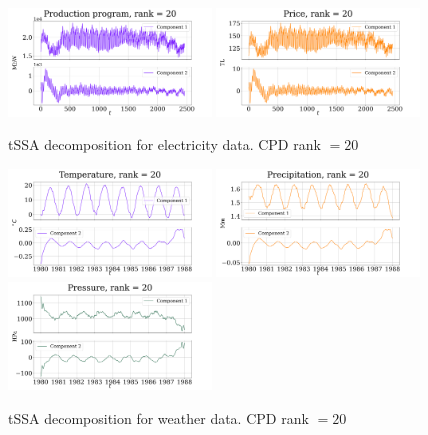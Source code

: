 \documentclass[referee, pdflatex]{sn-jnl}
\theoremstyle{definition}
\theoremstyle{plain}
\begin{document}
	\begin{figure}[h]
		\centering
		\includegraphics[width=0.48\textwidth, keepaspectratio]{../../experiments/electricity/tssa/figs/decomposition/cpd_rank_20/Production program.png}
		\includegraphics[width=0.48\textwidth, keepaspectratio]{../../experiments/electricity/tssa/figs/decomposition/cpd_rank_20/Price.png}
		\caption{tSSA decomposition for electricity data. CPD rank $ = 20 $}\label{fig:electr_decomp_tssa}
	\end{figure}
	
	\begin{figure}[h]
		\centering
		\includegraphics[width=0.48\textwidth, 	keepaspectratio]{../../experiments/weather/tssa/figs/decomposition/cpd_rank_20/Temperature.png}
		\includegraphics[width=0.48\textwidth, keepaspectratio]{../../experiments/weather/tssa/figs/decomposition/cpd_rank_20/Precipitation.png}
		\includegraphics[width=0.48\textwidth, keepaspectratio]{../../experiments/weather/tssa/figs/decomposition/cpd_rank_20/Pressure.png}
		\caption{tSSA decomposition for weather data. CPD rank $ = 20 $}\label{fig:weather_decomp_tssa}
	\end{figure}
	
\end{document}

